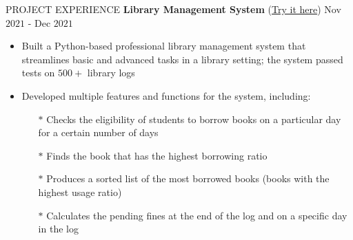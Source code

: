 \documentclass{resume} %
\begin{document}
\begin{rSection}{PROJECT EXPERIENCE}
\textbf{Library Management System }{(\href{https://github.com/harshitjain17/Library-Management-System}{Try it here})} \hfill Nov $2021$ - Dec $2021$
\begin{itemize}[itemsep = -4pt]
    \item Built a Python-based professional library management system that streamlines basic and advanced tasks in a library setting; the system passed tests on $500+$ library logs
    \item Developed multiple features and functions for the system, including:
    \begin{itemize}[itemsep = -4pt]
        \item[$*$] Checks the eligibility of students to borrow books on a particular day for a certain number of days
        \item[$*$] Finds the book that has the highest borrowing ratio
        \item[$*$] Produces a sorted list of the most borrowed books (books with the highest usage ratio)
        \item[$*$] Calculates the pending fines at the end of the log and on a specific day in the log
    \end{itemize}
\end{itemize}

\end{rSection} 



\end{document}
